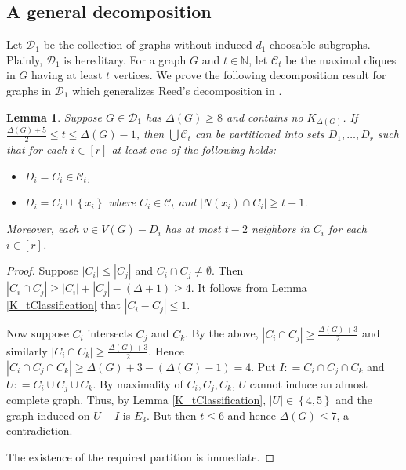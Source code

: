 \documentclass[12pt]{article}
\theoremstyle{plain}
\newtheorem{lem}[thm]{Lemma}
\theoremstyle{definition}
\theoremstyle{remark}
\newcommand{\fancy}[1]{\mathcal{#1}}
\newcommand{\IN}{\mathbb{N}}
\newcommand{\CC}{\fancy{C}}
\newcommand{\D}{\fancy{D}}
\newcommand{\set}[1]{\left\{ #1 \right\}}
\newcommand{\card}[1]{\left|#1\right|}
\newcommand{\irange}[1]{\left[#1\right]}
\newcommand{\DefinedAs}{\mathrel{\mathop:}=}
\def\D{\fancy{D}}
\begin{document}
\subsection{A general decomposition}\label{GeneralDecomposition}
Let $\D_1$ be the collection of graphs without induced $d_1$-choosable
subgraphs.  Plainly, $\D_1$ is hereditary. For a graph $G$ and $t \in \IN$, let
$\CC_t$ be the maximal cliques in $G$ having at least $t$ vertices. We prove the
following decomposition result for graphs in $\D_1$ which generalizes Reed's decomposition in \cite{reed1999strengthening}.  

\begin{lem}\label{partition}
Suppose $G \in \D_1$ has $\Delta(G) \geq 8$ and contains no $K_{\Delta(G)}$. If
$\frac{\Delta(G) + 5}{2} \leq t \leq \Delta(G) - 1$, then $\bigcup \CC_t$ can be
partitioned into sets $D_1, \ldots, D_r$ such that for each $i \in \irange{r}$
at least one of the following holds:
\begin{itemize}
  \item $D_i = C_i \in \CC_t$,
  \item $D_i = C_i \cup \set{x_i}$ where $C_i \in \CC_t$ and $\card{N(x_i) \cap
  C_i} \geq t-1$.
\end{itemize}

\noindent Moreover, each $v \in V(G) - D_i$ has at most $t-2$ neighbors in $C_i$  for each $i \in \irange{r}$.
\end{lem}
\begin{proof}
Suppose $\card{C_i} \leq \card{C_j}$ and $C_i \cap C_j \neq \emptyset$. 
Then $\card{C_i \cap C_j} \geq \card{C_i} + \card{C_j} - (\Delta + 1) \geq 4$.  It follows from Lemma
\ref{K_tClassification} that $\card{C_i - C_j} \leq 1$.

Now suppose $C_i$ intersects $C_j$ and $C_k$.  By the above,
$\card{C_i \cap C_j} \geq \frac{\Delta(G) + 3}{2}$ and similarly $\card{C_i \cap
C_k} \geq \frac{\Delta(G) + 3}{2}$.  Hence $\card{C_i \cap C_j \cap C_k} \geq
\Delta(G) + 3 - (\Delta(G) - 1) = 4$.  Put $I \DefinedAs C_i \cap C_j \cap C_k$
and $U \DefinedAs C_i \cup C_j \cup C_k$.  By maximality of $C_i, C_j, C_k$,
$U$ cannot induce an almost complete graph.  Thus, by Lemma
\ref{K_tClassification}, $\card{U} \in \set{4, 5}$ and the graph induced on $U -
I$ is $E_3$.  But then $t \leq 6$ and hence $\Delta(G) \leq 7$, a contradiction.

\smallskip

\noindent The existence of the required partition is immediate. 
\end{proof}
\end{document}
